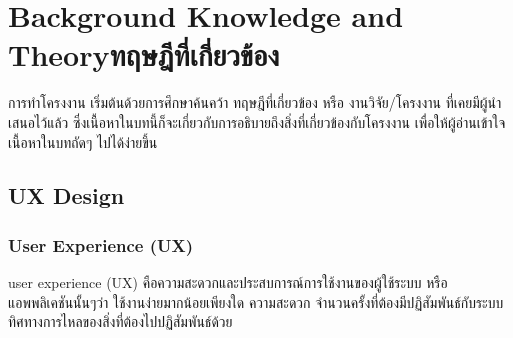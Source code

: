 \chapter{\ifenglish Background Knowledge and Theory\else ทฤษฎีที่เกี่ยวข้อง\fi}

การทำโครงงาน เริ่มต้นด้วยการศึกษาค้นคว้า ทฤษฎีที่เกี่ยวข้อง หรือ งานวิจัย/โครงงาน 
ที่เคยมีผู้นำเสนอไว้แล้ว ซึ่งเนื้อหาในบทนี้ก็จะเกี่ยวกับการอธิบายถึงสิ่งที่เกี่ยวข้องกับโครงงาน 
เพื่อให้ผู้อ่านเข้าใจเนื้อหาในบทถัดๆ ไปได้ง่ายขึ้น

\section{UX Design}
\subsection{User Experience (UX)}
user experience (UX) คือความสะดวกและประสบการณ์การใช้งานของผู้ใช้ระบบ 
หรือแอพพลิเคชันนั้นๆว่า ใช้งานง่ายมากน้อยเพียงใด ความสะดวก จำนวนครั้งที่ต้องมีปฏิสัมพันธ์กับระบบ
ทิศทางการไหลของสิ่งที่ต้องไปปฏิสัมพันธ์ด้วย
